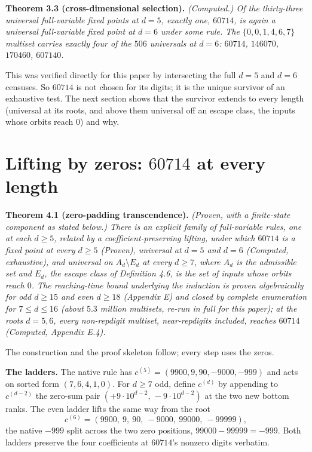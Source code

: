 \documentclass[11pt,letterpaper]{article}
\theoremstyle{paperstyle}
\theoremstyle{paperstyledef}
\theoremstyle{paperstylerem}
\begin{document}
\textbf{Theorem 3.3 (cross-dimensional selection).} \emph{(Computed.) Of the thirty-three universal full-variable fixed points at \(d = 5\), exactly one, \(60714\), is again a universal full-variable fixed point at \(d = 6\) under some rule. The \(\{0,0,1,4,6,7\}\) multiset carries exactly four of the \(506\) universals at \(d=6\): \(60714\), \(146070\), \(170460\), \(607140\).}

This was verified directly for this paper by intersecting the full \(d=5\) and \(d=6\) censuses. So \(60714\) is not chosen for its digits; it is the unique survivor of an exhaustive test. The next section shows that the survivor extends to every length (universal at its roots, and above them universal off an escape class, the inputs whose orbits reach \(0\)) and why.

\section{\texorpdfstring{Lifting by zeros: \(60714\) at every length}{Lifting by zeros: 60714 at every length}}\label{lifting-by-zeros-60714-at-every-length}

\textbf{Theorem 4.1 (zero-padding transcendence).} \emph{(Proven, with a finite-state component as stated below.) There is an explicit family of full-variable rules, one at each \(d \geq 5\), related by a coefficient-preserving lifting, under which \(60714\) is a fixed point at every \(d \geq 5\) (Proven), universal at \(d = 5\) and \(d = 6\) (Computed, exhaustive), and universal on \(A_d \setminus E_d\) at every \(d \geq 7\), where \(A_d\) is the admissible set and \(E_d\), the escape class of Definition 4.6, is the set of inputs whose orbits reach \(0\). The reaching-time bound underlying the induction is proven algebraically for odd \(d \geq 15\) and even \(d \geq 18\) (Appendix E) and closed by complete enumeration for \(7 \leq d \leq 16\) (about \(5.3\) million multisets, re-run in full for this paper); at the roots \(d = 5, 6\), every non-repdigit multiset, near-repdigits included, reaches \(60714\) (Computed, Appendix E.4).}

The construction and the proof skeleton follow; every step uses the zeros.

\textbf{The ladders.} The native rule has \(c^{(5)} = (9900, 9, 90, -9000, -999)\) and acts on sorted form \((7,6,4,1,0)\). For \(d \geq 7\) odd, define \(c^{(d)}\) by appending to \(c^{(d-2)}\) the zero-sum pair \((+9 \cdot 10^{d-2},\, -9\cdot 10^{d-2})\) at the two new bottom ranks. The even ladder lifts the same way from the root \[c^{(6)} = (9900,\ 9,\ 90,\ -9000,\ 99000,\ -99999),\] the native \(-999\) split across the two zero positions, \(99000 - 99999 = -999\). Both ladders preserve the four coefficients at \(60714\)'s nonzero digits verbatim.
\end{document}
